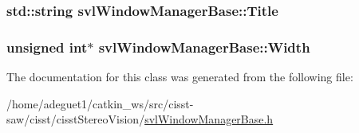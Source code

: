 \hypertarget{classsvl_window_manager_base_a2af9d334546d02350f18778ad285bfc9}{
\subsubsection[{Title}]{\setlength{\rightskip}{0pt plus 5cm}std\-::string svl\-Window\-Manager\-Base\-::\-Title\hspace{0.3cm}{\ttfamily [protected]}}}\label{classsvl_window_manager_base_a2af9d334546d02350f18778ad285bfc9}
\hypertarget{classsvl_window_manager_base_ab118e08eda56a7e8a3ecccf6e9fc68b7}{
\subsubsection[{Width}]{\setlength{\rightskip}{0pt plus 5cm}unsigned int$\ast$ svl\-Window\-Manager\-Base\-::\-Width\hspace{0.3cm}{\ttfamily [protected]}}}\label{classsvl_window_manager_base_ab118e08eda56a7e8a3ecccf6e9fc68b7}


The documentation for this class was generated from the following file\-:\begin{DoxyCompactItemize}
\item 
/home/adeguet1/catkin\-\_\-ws/src/cisst-\/saw/cisst/cisst\-Stereo\-Vision/\hyperlink{svl_window_manager_base_8h}{svl\-Window\-Manager\-Base.\-h}\end{DoxyCompactItemize}
